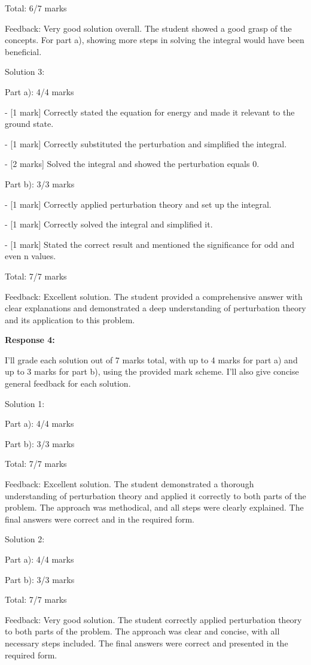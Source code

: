 \documentclass[a4paper,11pt]{article}
\begin{document}
Total: 6/7 marks

Feedback: Very good solution overall. The student showed a good grasp of the concepts. For part a), showing more steps in solving the integral would have been beneficial.

Solution 3:

Part a): 4/4 marks

- [1 mark] Correctly stated the equation for energy and made it relevant to the ground state.

- [1 mark] Correctly substituted the perturbation and simplified the integral.

- [2 marks] Solved the integral and showed the perturbation equals 0.

Part b): 3/3 marks

- [1 mark] Correctly applied perturbation theory and set up the integral.

- [1 mark] Correctly solved the integral and simplified it.

- [1 mark] Stated the correct result and mentioned the significance for odd and even n values.

Total: 7/7 marks

Feedback: Excellent solution. The student provided a comprehensive answer with clear explanations and demonstrated a deep understanding of perturbation theory and its application to this problem.

\bigskip
\textbf{Response 4:}

I'll grade each solution out of 7 marks total, with up to 4 marks for part a) and up to 3 marks for part b), using the provided mark scheme. I'll also give concise general feedback for each solution.

Solution 1:

Part a): 4/4 marks

Part b): 3/3 marks

Total: 7/7 marks

Feedback: Excellent solution. The student demonstrated a thorough understanding of perturbation theory and applied it correctly to both parts of the problem. The approach was methodical, and all steps were clearly explained. The final answers were correct and in the required form.

Solution 2:

Part a): 4/4 marks

Part b): 3/3 marks

Total: 7/7 marks

Feedback: Very good solution. The student correctly applied perturbation theory to both parts of the problem. The approach was clear and concise, with all necessary steps included. The final answers were correct and presented in the required form.
\end{document}
